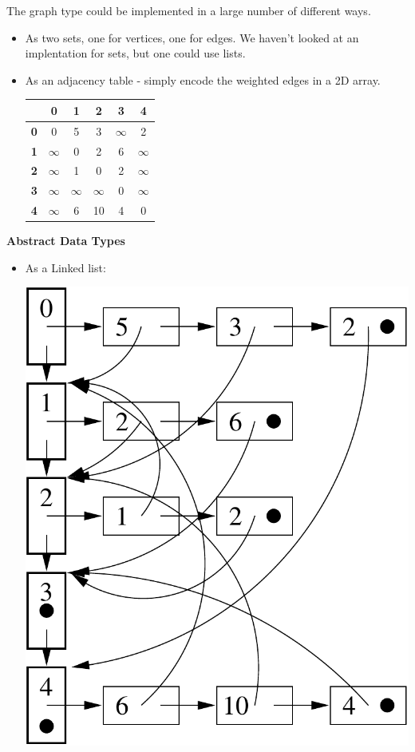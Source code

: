 \documentclass[a4,portraitt]{slides}
\begin{document}
{{The graph type could be implemented in a large number
of different ways.
\begin{itemize}
\item As two sets, one for vertices, one for edges.
We haven't looked at an implentation for sets, but one could use lists.
\item As an adjacency table - simply encode the weighted edges in a 2D array.
\begin{center}
\begin{tabular}{|c|ccccc|}\hline
& {\bf 0} & {\bf 1} & {\bf 2} & {\bf 3} & {\bf 4} \\ \hline
{\bf 0} & 0 & 5 & 3 & $\infty$ & 2 \\
{\bf 1} & $\infty$ & 0 & 2 & 6 & $\infty$ \\
{\bf 2} & $\infty$ & 1 & 0 & 2 & $\infty$ \\
{\bf 3} & $\infty$ &$\infty$ &$\infty$ & 0 & $\infty$ \\
{\bf 4} & $\infty$ & 6 & 10 & 4 & 0 \\ \hline
\end{tabular}
\end{center}
\end{itemize}
}

\newpage
{\samepage
\begin{center}
{\Large{\bf Abstract Data Types}}
\end{center}
\begin{itemize}
\item As a Linked list:
\begin{center}
\includegraphics{../Images/graphll.pdf}
\end{center}
\end{itemize}
}

}
\end{document}
